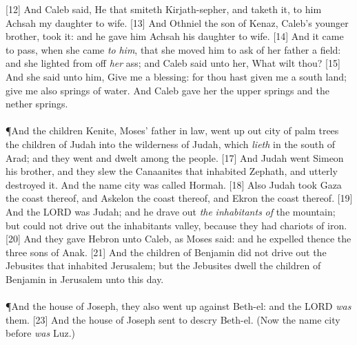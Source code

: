 [12] \textcolor[cmyk]{0.99998,1,0,0}{And Caleb said, He that smiteth Kirjath-sepher, and taketh it, to him  Achsah my daughter to wife.}
[13] \textcolor[cmyk]{0.99998,1,0,0}{And Othniel the son of Kenaz, Caleb's younger brother, took it: and he gave him Achsah his daughter to wife.}
[14] \textcolor[cmyk]{0.99998,1,0,0}{And it came to pass, when she came \emph{to} \emph{him}, that she moved him to ask of her father a field: and she lighted from off \emph{her} ass; and Caleb said unto her, What wilt thou?}
[15] \textcolor[cmyk]{0.99998,1,0,0}{And she said unto him, Give me a blessing: for thou hast given me a south land; give me also springs of water. And Caleb gave her the upper springs and the nether springs.}\\
\\
\P \textcolor[cmyk]{0.99998,1,0,0}{And the children  Kenite, Moses' father in law, went up out  city of palm trees  the children of Judah into the wilderness of Judah, which \emph{lieth} in the south of Arad; and they went and dwelt among the people.}
[17] \textcolor[cmyk]{0.99998,1,0,0}{And Judah went  Simeon his brother, and they slew the Canaanites that inhabited Zephath, and utterly destroyed it. And the name  city was called Hormah.}
[18] \textcolor[cmyk]{0.99998,1,0,0}{Also Judah took Gaza  the coast thereof, and Askelon  the coast thereof, and Ekron  the coast thereof.}
[19] \textcolor[cmyk]{0.99998,1,0,0}{And the LORD was  Judah; and he drave out \emph{the} \emph{inhabitants} \emph{of} the mountain; but could not drive out the inhabitants  valley, because they had chariots of iron.}
[20] \textcolor[cmyk]{0.99998,1,0,0}{And they gave Hebron unto Caleb, as Moses said: and he expelled thence the three sons of Anak.}
[21] \textcolor[cmyk]{0.99998,1,0,0}{And the children of Benjamin did not drive out the Jebusites that inhabited Jerusalem; but the Jebusites dwell  the children of Benjamin in Jerusalem unto this day.}\\
\\
\P \textcolor[cmyk]{0.99998,1,0,0}{And the house of Joseph, they also went up against Beth-el: and the LORD \emph{was}  them.}
[23] \textcolor[cmyk]{0.99998,1,0,0}{And the house of Joseph sent to descry Beth-el. (Now the name  city before \emph{was} Luz.)}
